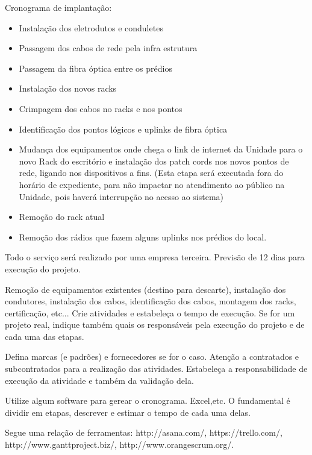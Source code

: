 \documentclass[	DIV=calc,%
							paper=a4,%
							fontsize=12pt,%
							onecolumn]{scrartcl}	 					%
\begin{document}
Cronograma de implantação:
\begin{itemize}
	\item Instalação dos eletrodutos e conduletes
	\item Passagem dos cabos de rede pela infra estrutura
	\item Passagem da fibra óptica entre os prédios
	\item Instalação dos novos racks
	\item Crimpagem dos cabos no racks e nos pontos
	\item Identificação dos pontos lógicos e uplinks de fibra óptica
	\item Mudança dos equipamentos onde chega o link de internet da Unidade para o novo Rack do escritório e instalação dos patch cords nos novos pontos de rede, ligando nos dispositivos a fins. (Esta etapa será executada fora do horário de expediente, para não impactar no atendimento ao público na Unidade, pois haverá interrupção no acesso ao sistema)
	\item Remoção do rack atual
	\item Remoção dos rádios que fazem alguns uplinks nos prédios do local.
\end{itemize}
Todo o serviço será realizado por uma empresa terceira. Previsão de 12 dias para execução do projeto.

Remoção de equipamentos existentes (destino para descarte), instalação dos condutores, instalação dos cabos, 
identificação dos cabos, montagem dos racks, certificação, etc... Crie atividades e estabeleça o tempo de execução. Se for um projeto real, indique também quais os responsáveis pela execução do projeto e de cada uma das etapas.

Defina marcas (e padrões) e fornecedores se for o caso. Atenção a contratados e subcontratados para a realização das atividades. Estabeleça a responsabilidade de execução da atividade e também da validação dela.

Utilize algum software para gerear o cronograma. Excel,etc. O fundamental é dividir em etapas, descrever e estimar o tempo de cada uma delas.

Segue uma relação de ferramentas:
http://asana.com/, 
https://trello.com/, 
http://www.ganttproject.biz/, 
http://www.orangescrum.org/. 

\end{document}

